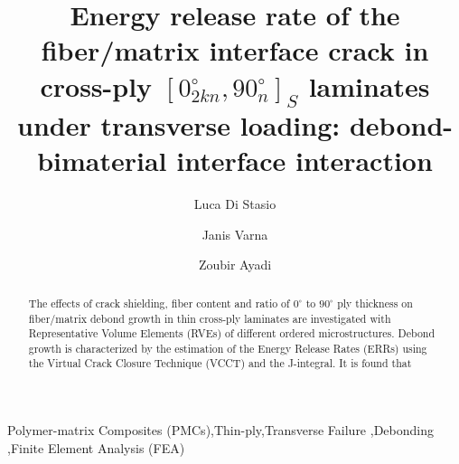 \documentclass[review]{elsarticle}
\begin{document}
\begin{frontmatter}

\title{Energy release rate of the fiber/matrix interface crack in cross-ply $\left[0_{2kn}^{\circ},90_{n}^{\circ}\right]_{S}$ laminates under transverse loading: debond-bimaterial interface interaction}


\author[nancy,lulea]{Luca Di Stasio}
\author[lulea]{Janis Varna}
\author[nancy]{Zoubir Ayadi}


\address[nancy]{Universit\'e de Lorraine, EEIGM, IJL, 6 Rue Bastien Lepage, F-54010 Nancy, France}
\address[lulea]{Lule\aa\ University of Technology, University Campus, SE-97187 Lule\aa, Sweden}

\begin{abstract}
\noindent
The effects of crack shielding, fiber content and ratio of $0^{\circ}$ to $90^{\circ}$ ply thickness on fiber/matrix debond growth in thin cross-ply laminates are investigated with Representative Volume Elements (RVEs) of different ordered microstructures. Debond growth is characterized by the estimation of the Energy Release Rates (ERRs) using the Virtual Crack Closure Technique (VCCT) and the J-integral. It is found that 
\end{abstract}

\begin{keyword}
Polymer-matrix Composites (PMCs)\sep Thin-ply\sep Transverse Failure \sep Debonding \sep Finite Element Analysis (FEA)
\end{keyword}


\end{frontmatter}
\end{document}
